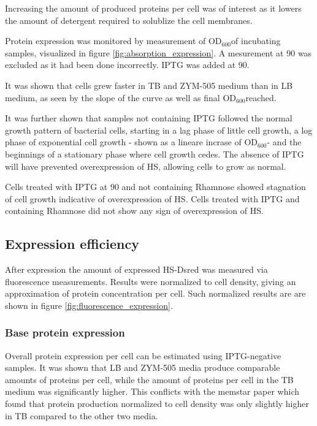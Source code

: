 \documentclass[a4paper,overfullrule=true]{scrartcl}
\newcommand{\odbact}{$\text{OD}_{600}$}
\begin{document}
Increasing the amount of produced proteins per cell was of interest as it
lowers the amount of detergent required to solublize the cell membranes.

Protein expression was monitored by measurement of \odbact of incubating
samples, visualized in figure \ref{fig:absorption_expression}. A mesurement at
\SI{90}{\min} was excluded as it had been done incorrectly. IPTG was added at
\SI{90}{\min}.

It was shown that cells grew faster in TB and ZYM-505 medium than in LB medium,
as seen by the slope of the curve as well as final \odbact reached.

It was further shown that samples not containing IPTG followed the normal
growth pattern of bacterial cells, starting in a lag phase of little cell
growth, a log phase of exponential cell growth - shown as a lineare incrase of
\odbact - and the beginnings of a stationary phase where cell growth cedes. The
absence of IPTG will have prevented overexpression of HS, allowing cells to
grow as normal.

Cells treated with IPTG at \SI{90}{\min} and not containing Rhamnose showed
stagnation of cell growth indicative of overexpression of HS. Cells treated
with IPTG and containing Rhamnose did not show any sign of overexpression of
HS.

\subsection{Expression efficiency}

After expression the amount of expressed HS-Dsred was measured via fluorescence
measurements. Results were normalized to cell density, giving an approximation
of protein concentration per cell. Such normalized results are are shown in
figure \ref{fig:fluorescence_expression}.

\subsubsection{Base protein expression}

Overall protein expression per cell can be estimated using IPTG-negative
samples. It was shown that LB and ZYM-505 media produce comparable amounts of
proteins per cell, while the amount of proteins per cell in the TB medium was
significantly higher. This conflicts with the memstar paper which found that
protein production normalized to cell density was only slightly higher in TB
compared to the other two media. \cite{memstar}
\end{document}
